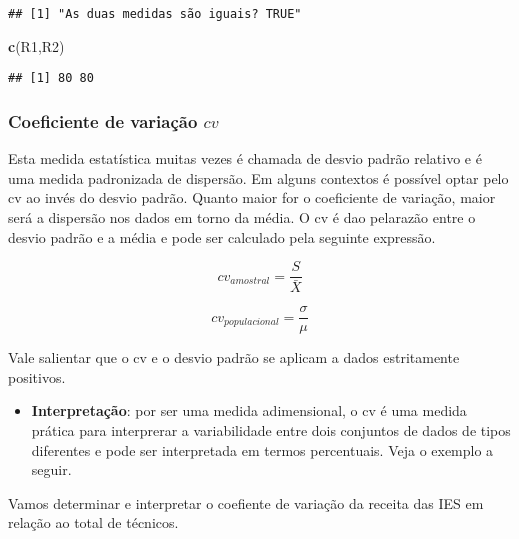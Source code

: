 \documentclass[12pt,]{style/krantz}
\makeatletter
\newenvironment{Shaded}{\begin{snugshade}}{\end{snugshade}}
\newcommand{\KeywordTok}[1]{\textcolor[rgb]{0.13,0.29,0.53}{\textbf{#1}}}
\newcommand{\NormalTok}[1]{#1}
\providecommand{\tightlist}{%
  \setlength{\itemsep}{0pt}\setlength{\parskip}{0pt}}
\renewenvironment{quote}{\begin{VF}}{\end{VF}}
\newenvironment{kframe}{%
\medskip{}
\setlength{\fboxsep}{.8em}
 \def\at@end@of@kframe{}%
 \ifinner\ifhmode%
  \def\at@end@of@kframe{\end{minipage}}%
  \begin{minipage}{\columnwidth}%
 \fi\fi%
 \def\FrameCommand##1{\hskip\@totalleftmargin \hskip-\fboxsep
 \colorbox{shadecolor}{##1}\hskip-\fboxsep
     \hskip-\linewidth \hskip-\@totalleftmargin \hskip\columnwidth}%
 \MakeFramed {\advance\hsize-\width
   \@totalleftmargin\z@ \linewidth\hsize
   \@setminipage}}%
 {\par\unskip\endMakeFramed%
 \at@end@of@kframe}
\renewenvironment{Shaded}{\begin{kframe}}{\end{kframe}}
\theoremstyle{definition}
\theoremstyle{definition}
\theoremstyle{definition}
\theoremstyle{remark}
\let\BeginKnitrBlock\begin \let\EndKnitrBlock\end
\makeatother
\begin{document}
\begin{verbatim}
## [1] "As duas medidas são iguais? TRUE"
\end{verbatim}

\begin{Shaded}
\begin{Highlighting}[]
\KeywordTok{c}\NormalTok{(R1,R2)}
\end{Highlighting}
\end{Shaded}

\begin{verbatim}
## [1] 80 80
\end{verbatim}

\hypertarget{coeficiente-de-variacao-cv}{%
\subsubsection{\texorpdfstring{Coeficiente de variação \(cv\)}{Coeficiente de variação cv}}\label{coeficiente-de-variacao-cv}}

Esta medida estatística muitas vezes é chamada de desvio padrão relativo e é uma medida padronizada de dispersão. Em alguns contextos é possível optar pelo cv ao invés do desvio padrão. Quanto maior for o coeficiente de variação, maior será a dispersão nos dados em torno da média. O cv é dao pelarazão entre o desvio padrão e a média e pode ser calculado pela seguinte expressão.

\[cv_{amostral} = \frac{S}{\bar X}\]

\[cv_{populacional} = \frac{\sigma}{\mu}\]

\begin{quote}
Vale salientar que o cv e o desvio padrão se aplicam a dados estritamente positivos.
\end{quote}

\begin{itemize}
\tightlist
\item
  \textbf{Interpretação}: por ser uma medida adimensional, o cv é uma medida prática para interprerar a variabilidade entre dois conjuntos de dados de tipos diferentes e pode ser interpretada em termos percentuais. Veja o exemplo a seguir.
\end{itemize}

\BeginKnitrBlock{example}
\protect\hypertarget{exm:unnamed-chunk-51}{}{\label{exm:unnamed-chunk-51} }Vamos determinar e interpretar o coefiente de variação da receita das IES em relação ao total de técnicos.
\EndKnitrBlock{example}
\end{document}
